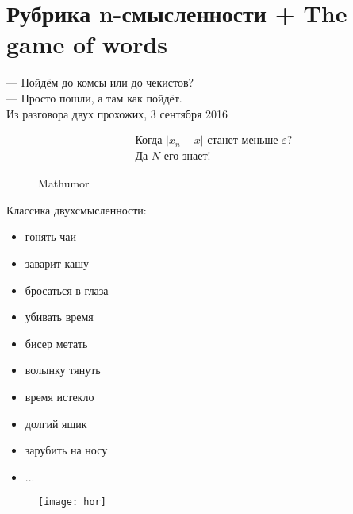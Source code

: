 \section{Рубрика n-смысленности + The game of words}
\begin{epigraph}
    --- Пойдём до комсы или до чекистов?\\
    --- Просто пошли, а там как пойдёт.\\
    Из разговора двух прохожих, 3 сентября 2016
\end{epigraph}

\begin{figure}[ht!]
    \centering
    \[
        \begin{array}{l}
            \text{--- Когда } |x_n - x| \text{ станет меньше } \varepsilon?\\
            \text{--- Да } N \text{ его знает}!
        \end{array}
    \]
    \caption{Mathumor}
\end{figure}

Классика двухсмысленности:
\begin{itemize}
    \item гонять чаи
    \item заварит кашу
    \item бросаться в глаза
    \item убивать время
    \item бисер метать
    \item волынку тянуть
    \item время истекло
    \item долгий ящик
    \item зарубить на носу
    \item ...
\end{itemize}

\begin{figure}[ht!]
    \centering
    \texttt{[image: hor]}
\end{figure}

\begin{flushright}
\end{flushright}

